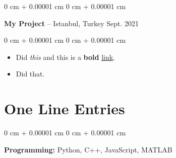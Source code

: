 \documentclass[10pt, letterpaper]{article}
\newenvironment{highlights}{
    \begin{itemize}[
        topsep=0.10 cm,
        parsep=0.10 cm,
        partopsep=0pt,
        itemsep=0pt,
        leftmargin=0 cm + 10pt
    ]
}{
    \end{itemize}
        
    \vspace{-0.10cm}
} %
\newenvironment{onecolentry}{
    \begin{adjustwidth}{
        0 cm + 0.00001 cm
    }{
        0 cm + 0.00001 cm
    }
}{
    \end{adjustwidth}
} %
\newenvironment{twocolentry}[2][]{
    \onecolentry
    \def\secondColumn{#2}
    \setcolumnwidth{\fill, 4.1 cm}
    \begin{paracol}{2}
}{
    \switchcolumn \raggedleft \secondColumn
    \end{paracol}
    \endonecolentry
} %
\begin{document}
        \vspace{0.15 cm}

        \begin{twocolentry}{
            Sept. 2021
        }
            \textbf{My Project} -- Istanbul, Turkey\end{twocolentry}

        \vspace{0.10 cm}
        \begin{onecolentry}
            \begin{highlights}
                \item Did \textit{this} and this is a \textbf{bold} \href{https://example.com}{link}.
                \item Did that.
            \end{highlights}
        \end{onecolentry}



    
    \section{One Line Entries}

        
        \begin{onecolentry}
            \textbf{Pro\textnormal{gram}ming:} Python, C++, JavaScript, MATLAB
        \end{onecolentry}


    
\end{document}
